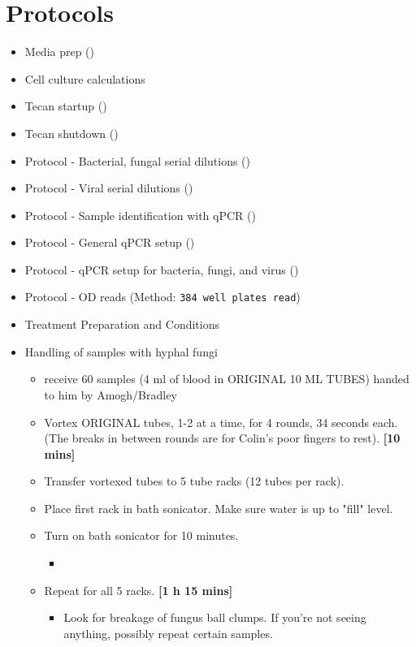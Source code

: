 \documentclass{article}
\begin{document}
\section{Protocols}
\begin{itemize}
    \item Media prep ()
    \item Cell culture calculations
    \item Tecan startup ()
    \item Tecan shutdown ()
    \item Protocol - Bacterial, fungal serial dilutions ()
    \item Protocol - Viral serial dilutions ()
    \item Protocol - Sample identification with qPCR  ()
    \item Protocol - General qPCR setup ()
    \item Protocol - qPCR setup for bacteria, fungi, and virus ()
    \item Protocol - OD reads (Method: \texttt{384 well plates read})
    \item Treatment Preparation and Conditions 
    \item Handling of samples with hyphal fungi 
    \begin{itemize}
        \item receive 60 samples (4 ml of blood in ORIGINAL 10 ML TUBES) handed to him by Amogh/Bradley
        \item Vortex ORIGINAL tubes, 1-2 at a time, for 4 rounds, 34 seconds each. (The breaks in between rounds are for Colin's poor fingers to rest). \textbf{[10 mins]}
        \item Transfer vortexed tubes to 5 tube racks (12 tubes per rack).
        \item Place first rack in bath sonicator. Make sure water is up to "fill" level.
        \item Turn on bath sonicator for 10 minutes. 
        \begin{itemize}
            \item 
        \end{itemize}
        \item Repeat for all 5 racks. \textbf{[1 h 15 mins]}
        \begin{itemize}
            \item Look for breakage of fungus ball clumps. If you're not seeing anything, possibly repeat certain samples.

\end{itemize}
\end{itemize}
\end{itemize}
\end{document}
